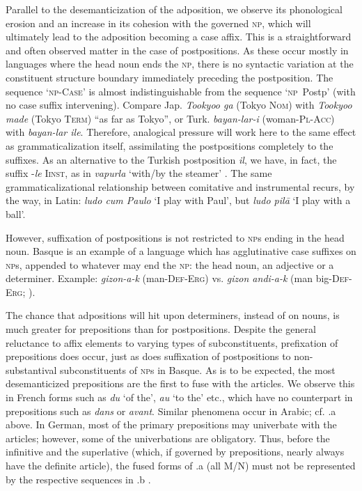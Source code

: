 Parallel to the desemanticization of the adposition, we observe its phonological erosion and an increase in its cohesion with the governed \textsc{np}, which will ultimately lead to the adposition becoming a case affix. This is a straightforward and often observed matter in the case of postpositions. As these occur mostly in languages where the head noun ends the \textsc{np}, there is no syntactic variation at the constituent structure boundary immediately preceding the postposition. The sequence ‘\textsc{np}-\textsc{Case}’ is almost indistinguishable from the sequence ‘\textsc{np}~Postp’ (with no case suffix intervening). Compare Jap. \textit{Tookyoo ga} (Tokyo \textsc{Nom}) with \textit{Tookyoo made} (Tokyo \textsc{Term}) “as far as Tokyo”, or Turk. \textit{bayan-lar-i} (woman-\textsc{Pl-Acc}) with \textit{bayan-lar ile}. Therefore, analogical pressure will work here to the same effect as grammaticalization itself, assimilating the postpositions completely to the suffixes.\label{page89} As an alternative to the Turkish postposition \textit{il}, we have, in fact, the suffix -\textit{le} \textsc{Iinst}, as in \textit{vapurla} ‘with/by the steamer’ \citep[63]{Wendt1972}. The same grammaticalizational relationship between comitative and instrumental recurs, by the way, in Latin: \textit{ludo cum Paulo} ‘I play with Paul’, but \textit{ludo pil\=a} ‘I play with a ball’.

However, suffixation of postpositions is not restricted to \textsc{np}s ending in the head noun. Basque is an example of a language which has agglutinative case suffixes on \textsc{np}s, appended to whatever may end the \textsc{np}: the head noun, an adjective or a determiner. Example: \textit{gizon-a-k} (man-\textsc{Def-Erg}) vs. \textit{gizon andi-a-k} (man big-\textsc{Def-Erg}; \citealt[69]{Brettschneider1978}).

The chance that adpositions will hit upon determiners, instead of on nouns, is much greater for prepositions than for postpositions. Despite the general reluctance to affix elements to varying types of subconstituents, prefixation of prepositions does occur, just as does suffixation of postpositions to non-substantival subconstituents of \textsc{np}s in Basque. As is to be expected, the most desemanticized prepositions are the first to fuse with the articles. We observe this in French forms such as \textit{du} ‘of the’, \textit{au} ‘to the’ etc., which have no counterpart in prepositions such as \textit{dans} or \textit{avant}. Similar phenomena occur in Arabic; cf. .a above. In German, most of the primary prepositions may univerbate with the articles; however, some of the univerbations are obligatory. Thus, before the infinitive and the superlative (which, if governed by prepositions, nearly always have the definite article), the fused forms of .a (all M/N) must not be represented by the respective sequences in .b \citep[36]{Vater1979}.

